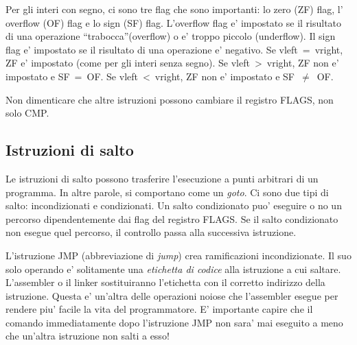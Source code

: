 Per gli interi con segno, ci sono tre flag che sono
importanti: lo zero  (ZF) flag, l'
overflow (OF) flag  e lo sign
 (SF) flag. L'overflow flag e' impostato se il risultato di una
operazione ``trabocca''(overflow) o e' troppo piccolo (underflow). 
Il sign flag e' impostato se il risultato di una operazione e' negativo. 
Se {\code vleft~=~vright}, ZF e' impostato (come per gli interi senza 
segno). Se {\code vleft~>~vright}, ZF non e' impostato e SF~=~OF. 
Se {\code vleft~<~vright}, ZF non e' impostato e SF~$\neq$~OF.

Non dimenticare che altre istruzioni possono cambiare il registro
FLAGS, non solo {\code CMP}.

\subsection{Istruzioni di salto}

Le istruzioni di salto possono trasferire l'esecuzione a punti
arbitrari di un programma. In altre parole, si comportano come un \emph{goto}.
Ci sono due tipi di salto: incondizionati e condizionati. Un salto 
condizionato puo' eseguire o no un percorso dipendentemente dai 
flag del registro FLAGS. Se il salto condizionato non esegue quel
percorso, il controllo passa alla successiva istruzione.

L'istruzione {\code JMP} (abbreviazione di \emph{jump}) crea 
ramificazioni incondizionate. Il suo solo operando e' solitamente una
\emph{etichetta di codice} alla istruzione a cui saltare. L'assembler
o il linker sostituiranno l'etichetta con il corretto indirizzo della
istruzione. Questa e' un'altra delle operazioni noiose che l'assembler
esegue per rendere piu' facile la vita del programmatore. E' importante
capire che il comando immediatamente dopo l'istruzione {\code JMP} non
sara' mai eseguito a meno che un'altra istruzione non salti a esso!

